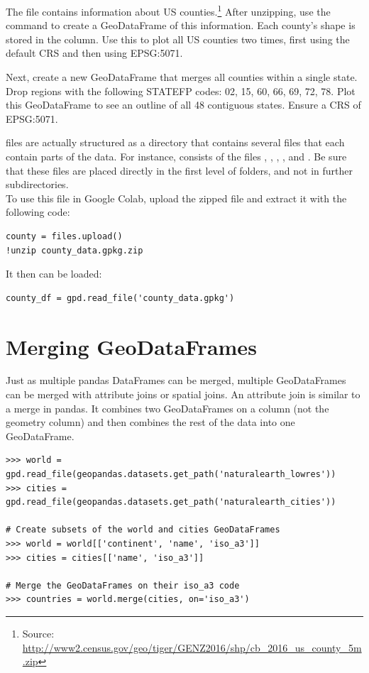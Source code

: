 \begin{problem}
The file  contains information about US counties.\footnote{Source: \url{http://www2.census.gov/geo/tiger/GENZ2016/shp/cb_2016_us_county_5m.zip}}
After unzipping, use the command  to create a GeoDataFrame of this information.
Each county's shape is stored in the  column.
Use this to plot all US counties two times, first using the default CRS and then using EPSG:5071.

Next, create a new GeoDataFrame that merges all counties within a single state.
Drop regions with the following STATEFP codes: 02, 15, 60, 66, 69, 72, 78.
Plot this GeoDataFrame to see an outline of all 48 contiguous states.
Ensure a CRS  of EPSG:5071.
\label{problem:us_counties}
\end{problem}
\begin{info}
 files are actually structured as a directory that contains several files that each contain parts of the data.
For instance,  consists of the files , , , , and .
Be sure that these files are placed directly in the first level of folders, and not in further subdirectories.\\
To use this file in Google Colab, upload the zipped file and extract it with the following code:
\begin{lstlisting}
county = files.upload()
!unzip county_data.gpkg.zip
\end{lstlisting}
It then can be loaded:
\begin{lstlisting}
county_df = gpd.read_file('county_data.gpkg')
\end{lstlisting}
\end{info}

\section*{Merging GeoDataFrames} %

Just as multiple pandas DataFrames can be merged, multiple GeoDataFrames can be merged with attribute joins or spatial joins.
An attribute join is similar to a merge in pandas.
It combines two GeoDataFrames on a column (not the geometry column) and then combines the rest of the data into one GeoDataFrame.

\begin{lstlisting}
>>> world = gpd.read_file(geopandas.datasets.get_path('naturalearth_lowres'))
>>> cities = gpd.read_file(geopandas.datasets.get_path('naturalearth_cities'))

# Create subsets of the world and cities GeoDataFrames
>>> world = world[['continent', 'name', 'iso_a3']]
>>> cities = cities[['name', 'iso_a3']]

# Merge the GeoDataFrames on their iso_a3 code
>>> countries = world.merge(cities, on='iso_a3')
\end{lstlisting}


